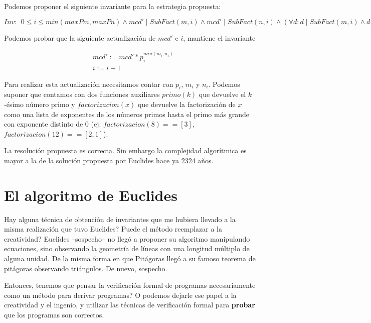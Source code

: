 \documentclass[12pt, a4paper, openany, fleqn]{book}
\begin{document}
    Podemos proponer el siguiente invariante para la estrategia propuesta:
    \begin{center}
        \begin{math}
            Inv:\ \  0 \leqslant i \leqslant min(maxPm, maxPn) \land mcd' \mathrel{|} SubFact(m, i) \land mcd' \mathrel{|} SubFact(n, i) \land (\forall d: d \mathrel{|} SubFact(m, i) \land d \mathrel{|} SubFact(n, i) : d \leq mcd') 
        \end{math}
    \end{center}

    Podemos probar que la siguiente actualización de $mcd'$ e $i$, mantiene el invariante

    \begin{align*}
        & mcd' := mcd' * p_{i}^{min(m_{i}, n_{i})} \\
        & i := i + 1
    \end{align*}

    Para realizar esta actualización necesitamos contar con $p_{i}$, $m_{i}$ y $n_{i}$.
    Podemos suponer que contamos con dos funciones auxiliares $primo(k)$ que devuelve el $k$-ésimo número primo y $factorizacion(x)$ que devuelve la factorización de $x$ como una lista de exponentes de los números primos hasta el primo más grande con exponente distinto de 0 (ej: $factorizacion(8) == [3]$, $factorizacion(12) == [2,1]$).

    La resolución propuesta es correcta. Sin embargo la complejidad algorítmica es mayor a la de la solución propuesta por Euclides hace ya 2324 años.

    \section{El algoritmo de Euclides}
    Hay alguna técnica de obtención de invariantes que me hubiera llevado a la misma realización que tuvo Euclides? Puede el método reemplazar a la creatividad?
    Euclides --sospecho-- no llegó a proponer su algoritmo manipulando ecuaciones, sino observando la geometría de líneas con una longitud múltiplo de alguna unidad. De la misma forma en que Pitágoras llegó a su famoso teorema de pitágoras observando triángulos. De nuevo, sospecho.

    Entonces, tenemos que pensar la verificación formal de programas necesariamente como un método para derivar programas? O podemos dejarle ese papel a la creatividad y el ingenio, y utilizar las técnicas de verificación formal para \textbf{probar} que los programas son correctos.
\end{document}
